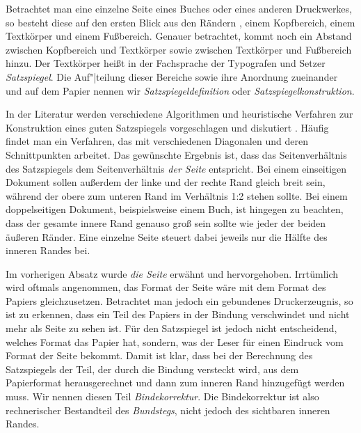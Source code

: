 \begin{Explain}
  Betrachtet man eine einzelne Seite eines Buches oder eines anderen
  Druckwerkes, so besteht diese auf den ersten Blick aus den Rändern%
  \iffalse%
  \footnote{Der Autor und der Lektor haben an dieser Stelle überlegt, ob eine
    Seite nicht nur einen umlaufenden Rand hat und daher von »dem Rand« die
    Rede sein müsste. Da jedoch \LaTeX{} diesen einen Rand logisch in mehrere
    Ränder unterteilt, die getrennt bestimmt werden, ist hier auch von »den
    Rändern« die Rede.}%
  \fi%
  , einem Kopfbereich, einem Textkörper und einem Fußbereich.  Genauer
  betrachtet, kommt noch ein Abstand zwischen Kopfbereich und Textkörper sowie
  zwischen Textkörper und Fußbereich hinzu.  Der Textkörper heißt in der
  Fachsprache der Typografen und Setzer \emph{Satzspiegel}. Die Auf"|teilung
  dieser Bereiche sowie ihre Anordnung zueinander und auf dem Papier nennen
  wir \emph{Satzspiegeldefinition} oder
  \emph{Satzspiegelkonstruktion}.
  
  In der Literatur werden verschiedene Algorithmen und heuristische Verfahren
  zur Konstruktion eines guten Satzspiegels vorgeschlagen und diskutiert%
  . Häufig findet man ein Verfahren, das mit verschiedenen Diagonalen
  und deren Schnittpunkten arbeitet. Das gewünschte Ergebnis ist, dass das
  Seitenverhältnis des Satzspiegels dem Seitenverhältnis \emph{der Seite}
  entspricht. Bei einem einseitigen Dokument sollen außerdem
  der linke und der rechte Rand gleich breit sein, während der obere zum
  unteren Rand im Verhältnis 1:2 stehen sollte. Bei einem
  doppelseitigen Dokument, beispielsweise einem Buch, ist
  hingegen zu beachten, dass der gesamte innere Rand genauso groß sein sollte
  wie jeder der beiden äußeren Ränder. Eine einzelne Seite steuert dabei
  jeweils nur die Hälfte des inneren Randes bei.
  
  Im vorherigen Absatz wurde \emph{die Seite} erwähnt und
  hervorgehoben. Irrtümlich wird oftmals angenommen, das Format der Seite wäre
  mit dem Format des Papiers gleichzusetzen.
   Betrachtet man jedoch ein gebundenes
  Druckerzeugnis, so ist zu erkennen, dass ein Teil des Papiers in der
  Bindung verschwindet und nicht mehr als Seite zu
  sehen ist. Für den Satzspiegel ist jedoch nicht entscheidend, welches Format
  das Papier hat, sondern, was der Leser für einen Eindruck vom Format der
  Seite bekommt. Damit ist klar, dass bei der Berechnung des Satzspiegels der
  Teil, der durch die Bindung versteckt wird, aus dem Papierformat
  herausgerechnet und dann zum inneren Rand hinzugefügt werden muss. Wir
  nennen diesen Teil
  \emph{Bindekorrektur}.%
  Die Bindekorrektur ist also rechnerischer Bestandteil des
  \emph{Bundstegs}, nicht jedoch des sichtbaren
  inneren Randes.


\end{Explain}
